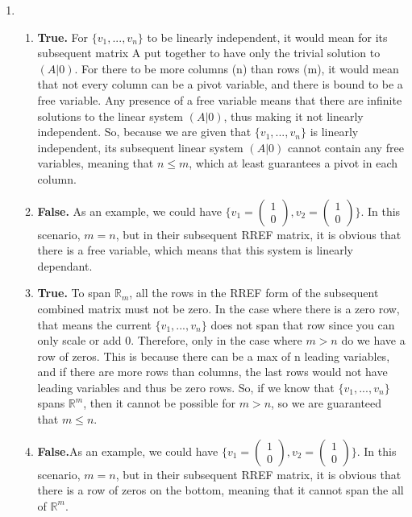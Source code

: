 \documentclass{article}
\begin{document}
\begin{enumerate}
\begin{enumerate}
\end{enumerate}

\item

\begin{enumerate}

\item \textbf{True.} For $\{v_1,...,v_n\}$ to be linearly independent, it would mean for its subsequent matrix A put together to have only the trivial solution to $(A|0)$. For there to be more columns (n) than rows (m), it would mean that not every column can be a pivot variable, and there is bound to be a free variable. Any presence of a free variable means that there are infinite solutions to the linear system $(A|0)$, thus making it not linearly independent. So, because we are given that $\{v_1,...,v_n\}$ is linearly independent, its subsequent linear system $(A|0)$ cannot contain any free variables, meaning that $n \leq m$, which at least guarantees a pivot in each column.

\item \textbf{False.} As an example, we could have $\{v_1 = \left(\begin{array}{c} 1 \\ 0 \end{array}\right),v_2 = \left(\begin{array}{c} 1 \\ 0 \end{array}\right)\}$. In this scenario, $m = n$, but in their subsequent RREF matrix, it is obvious that there is a free variable, which means that this system is linearly dependant.

\item \textbf{True.} To span $\mathbb{R}_m$, all the rows in the RREF form of the subsequent combined matrix must not be zero. In the case where there is a zero row, that means the current $\{v_1, ... ,v_n\}$ does not span that row since you can only scale or add 0. Therefore, only in the case where $m>n$ do we have a row of zeros. This is because there can be a max of n leading variables, and if there are more rows than columns, the last rows would not have leading variables and thus be zero rows. So, if we know that $\{v_1,...,v_n\}$ spans $\mathbb{R}^m$, then it cannot be possible for $m>n$, so we are guaranteed that $m \leq n$.

\item \textbf{False.}As an example, we could have $\{v_1 = \left(\begin{array}{c} 1 \\ 0 \end{array}\right),v_2 = \left(\begin{array}{c} 1 \\ 0 \end{array}\right)\}$. In this scenario, $m = n$, but in their subsequent RREF matrix, it is obvious that there is a row of zeros on the bottom, meaning that it cannot span the all of $\mathbb{R}^m$.


\end{enumerate}
\end{enumerate}
\end{document}
